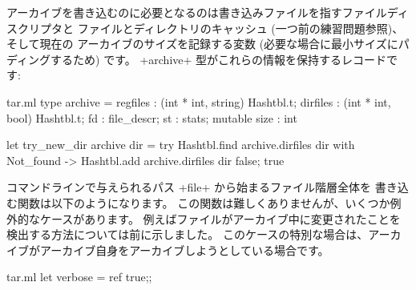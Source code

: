 \begin{answer}
アーカイブを書き込むのに必要となるのは書き込みファイルを指すファイルディスクリプタと
ファイルとディレクトリのキャッシュ (一つ前の練習問題参照)、 そして現在の
アーカイブのサイズを記録する変数 (必要な場合に最小サイズにパディングするため) です。
\ml+archive+ 型がこれらの情報を保持するレコードです:
%
\begin{listingcodefile}{tar.ml}
type archive =
    { regfiles : (int * int, string) Hashtbl.t;
      dirfiles : (int * int, bool) Hashtbl.t;
      fd : file_descr; st : stats; mutable size : int }

let try_new_dir archive dir =
  try Hashtbl.find archive.dirfiles dir
  with Not_found -> Hashtbl.add archive.dirfiles dir false; true
\end{listingcodefile}
%
コマンドラインで与えられるパス \ml+file+ から始まるファイル階層全体を
書き込む関数は以下のようになります。
この関数は難しくありませんが、いくつか例外的なケースがあります。
例えばファイルがアーカイブ中に変更されたことを検出する方法については前に示しました。
このケースの特別な場合は、アーカイブがアーカイブ自身をアーカイブしようとしている場合です。
%
\begin{listingcodefile}{tar.ml}
let verbose = ref true;;


\end{listingcodefile}
\end{answer}
